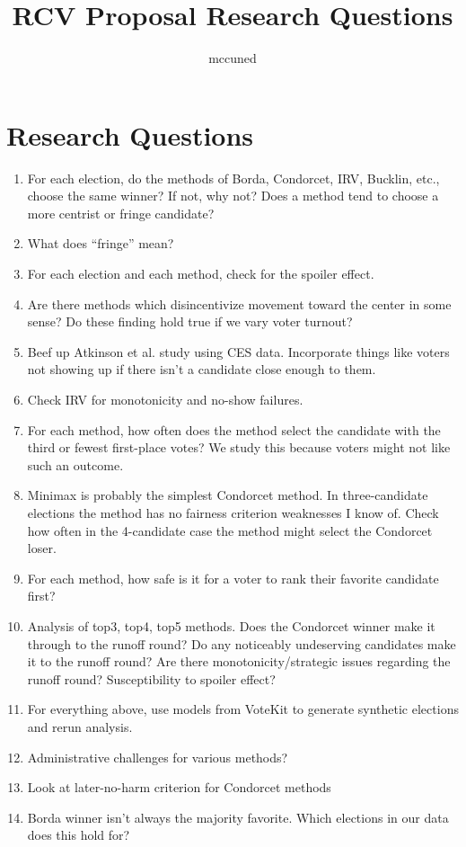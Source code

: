 \documentclass{article}
\title{RCV Proposal Research Questions}
\author{mccuned }
\date{}
\begin{document}
\maketitle

\section{Research Questions}

\begin{enumerate}
\item For each election, do the methods of Borda, Condorcet, IRV, Bucklin, etc., choose the same winner? If not, why not? Does a method tend to choose a more centrist or fringe candidate?
\item What does ``fringe'' mean?
\item For each election and each method, check for the spoiler effect.
\item Are there methods which disincentivize movement toward the center in some sense? Do these finding hold true if we vary voter turnout?
\item Beef up Atkinson et al. study using CES data. Incorporate things like voters not showing up if there isn't a candidate close enough to them.
\item Check IRV for monotonicity and no-show failures.
\item For each method, how often does the method select the candidate with the third or fewest first-place votes? We study this because voters might not like such an outcome.
\item Minimax is probably the simplest Condorcet method. In three-candidate elections the method has no fairness criterion weaknesses I know of. Check how often in the 4-candidate case the method might select the Condorcet loser.
\item For each method, how safe is it for a voter to rank their favorite candidate first?
\item Analysis of top3, top4, top5 methods. Does the Condorcet winner make it through to the runoff round? Do any noticeably undeserving candidates make it to the runoff round? Are there monotonicity/strategic issues regarding the runoff round? Susceptibility to spoiler effect?
\item For everything above, use models from VoteKit to generate synthetic elections and rerun analysis.
\item Administrative challenges for various methods?

\item Look at later-no-harm criterion for Condorcet methods
\item Borda winner isn't always the majority favorite. Which elections in our data does this hold for?
\end{enumerate}
\end{document}
